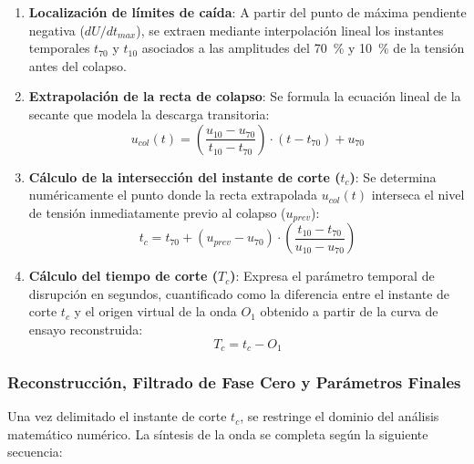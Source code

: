 \begin{enumerate}
    \item \textbf{Localización de límites de caída}: A partir del punto de máxima pendiente negativa ($dU/dt_{max}$), se extraen mediante interpolación lineal los instantes temporales $t_{70}$ y $t_{10}$ asociados a las amplitudes del \qty{70}{\percent} y \qty{10}{\percent} de la tensión antes del colapso.
    \item \textbf{Extrapolación de la recta de colapso}: Se formula la ecuación lineal de la secante que modela la descarga transitoria:
    \begin{equation}
    \label{eq:recta_colapso}
    u_{col}(t) = \left( \frac{u_{10} - u_{70}}{t_{10} - t_{70}} \right) \cdot (t - t_{70}) + u_{70}
    \end{equation}
    \item \textbf{Cálculo de la intersección del instante de corte ($t_c$)}: Se determina numéricamente el punto donde la recta extrapolada $u_{col}(t)$ interseca el nivel de tensión inmediatamente previo al colapso ($u_{prev}$):
    \begin{equation}
    \label{eq:instante_corte_final}
    t_c = t_{70} + (u_{prev} - u_{70}) \cdot \left( \frac{t_{10} - t_{70}}{u_{10} - u_{70}} \right)
    \end{equation}
    \item \textbf{Cálculo del tiempo de corte ($T_c$)}: Expresa el parámetro temporal de disrupción en segundos, cuantificado como la diferencia entre el instante de corte $t_c$ y el origen virtual de la onda $O_1$ obtenido a partir de la curva de ensayo reconstruida:
    \begin{equation}
    \label{eq:tiempo_corte_tc}
    T_c = t_c - O_1
    \end{equation}
\end{enumerate}

\subsubsection{Reconstrucción, Filtrado de Fase Cero y Parámetros Finales}
\label{subsubsection:reconstruccion_lic}

Una vez delimitado el instante de corte $t_c$, se restringe el dominio del análisis matemático numérico. La síntesis de la onda se completa según la siguiente secuencia:

